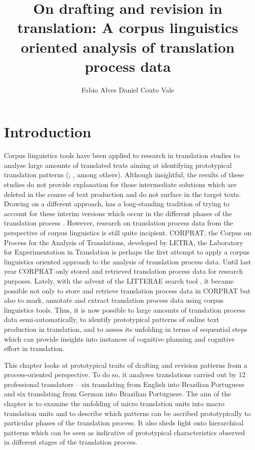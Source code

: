 \documentclass[output=paper]{LSP/langsci}
\author{Fabio Alves\affiliation{Federal University of Minas Gerais}\lastand 
Daniel Couto Vale\affiliation{Federal University of Minas Gerais}
}
\title{On drafting and revision in translation: A corpus linguistics oriented analysis of translation process data}
\begin{document}

\section{Introduction}\label{sec:alves:1}
\largerpage
Corpus linguistics tools have been applied to research in translation studies to analyse large amounts of translated texts aiming at identifying prototypical translation patterns (\citealt{OlohanEtAl2000}; \citealt{HansenEtAl2007}, among others). Although insightful, the results of these studies do not provide explanation for those intermediate solutions which are deleted in the course of text production and do not surface in the target texts. Drawing on a different approach,  has a long-standing tradition of trying to account for these interim versions which occur in the different phases of the translation process \citep{Alves2007}. However, research on translation process data from the perspective of corpus linguistics is still quite incipient. CORPRAT, the Corpus on Process for the Analysis of Translations, developed by LETRA, the Laboratory for Experimentation in Translation \citep{PaganoEtAl2004} is perhaps the first attempt to apply a corpus linguistics oriented approach to the analysis of translation process data. Until last year CORPRAT only stored and retrieved translation process data for research purposes. Lately, with the advent of the LITTERAE search tool \citep{AlvesVale2009}, it became possible not only to store and retrieve translation process data in CORPRAT but also to mark, annotate and extract translation process data using corpus linguistics tools. Thus, it is now possible to  large amounts of translation process data semi-automatically, to identify prototypical patterns of online text production in translation, and to assess its unfolding in terms of sequential steps which can provide insights into instances of cognitive planning and cognitive effort in translation. 

This chapter looks at prototypical traits of drafting and revision patterns from a process-oriented perspective. To do so, it analyses translations carried out by 12 professional translators -- six translating from English into Brazilian Portuguese and six translating from German into Brazilian Portuguese. The aim of the chapter is to examine the unfolding of micro translation units into macro translation units \citep{AlvesVale2009,AlvesEtAl2010} and to describe which patterns can be ascribed prototypically to particular phases of the translation process. It also sheds light onto hierarchical patterns which can be seen as indicative of prototypical characteristics observed in different stages of the translation process.
\end{document}
